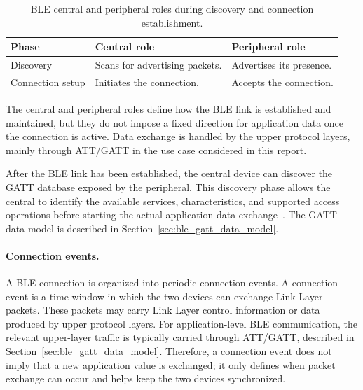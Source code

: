 \begin{table}[H]
	\centering
	\small
	\caption{BLE central and peripheral roles during discovery and connection establishment.}
	\label{tab:ble_connection_roles}
	\begin{tabular}{p{} p{} p{}}
		\toprule
		\textbf{Phase} & \textbf{Central role} & \textbf{Peripheral role} \\
		\midrule
		Discovery &
		Scans for advertising packets. &
		Advertises its presence. \\
		
		Connection setup &
		Initiates the connection. &
		Accepts the connection. \\
		\bottomrule
	\end{tabular}
\end{table}

The central and peripheral roles define how the BLE link is established and maintained, but they do not impose a fixed direction for application data once the connection is active. 
Data exchange is handled by the upper protocol layers, mainly through ATT/GATT in the use case considered in this report.

After the BLE link has been established, the central device can discover the GATT database exposed by the peripheral. 
This discovery phase allows the central to identify the available services, characteristics, and supported access operations before starting the actual application data exchange~\cite{bluetooth_core_gatt}. 
The GATT data model is described in Section~\ref{sec:ble_gatt_data_model}.




\paragraph{Connection events.}
A BLE connection is organized into periodic connection events. 
A connection event is a time window in which the two devices can exchange Link Layer packets. 
These packets may carry Link Layer control information or data produced by upper protocol layers. 
For application-level BLE communication, the relevant upper-layer traffic is typically carried through ATT/GATT, described in Section~\ref{sec:ble_gatt_data_model}. 
Therefore, a connection event does not imply that a new application value is exchanged; it only defines when packet exchange can occur and helps keep the two devices synchronized.




